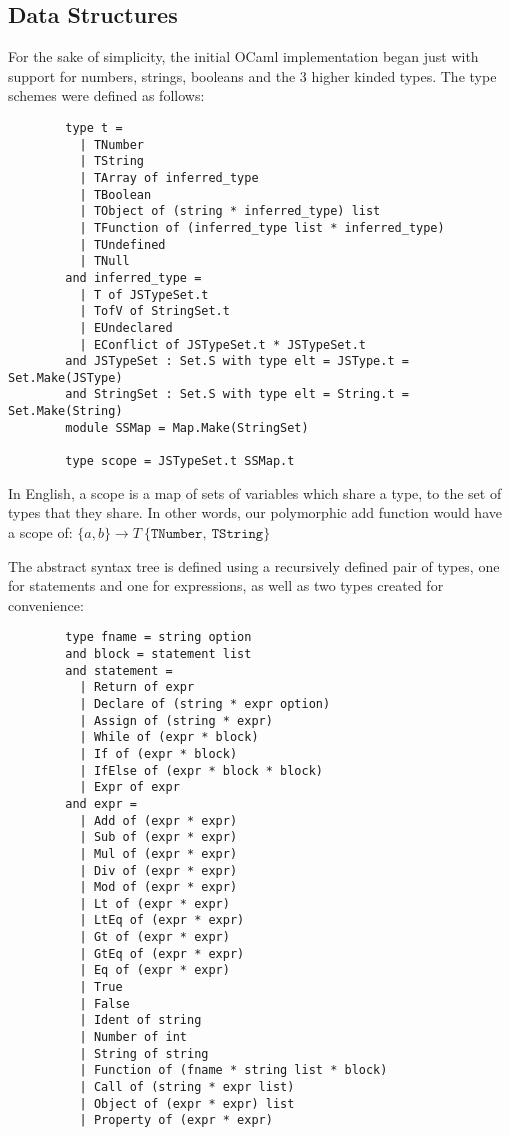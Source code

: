 \documentclass[british, twoside, openright]{bhamthesis}
\theoremstyle{definition}
\begin{document}
    \subsection{Data Structures}
      For the sake of simplicity, the initial OCaml implementation began just with support for numbers, strings, booleans and the 3 higher kinded types. The type schemes were defined as follows:

      \begin{lstlisting}
        type t =
          | TNumber
          | TString
          | TArray of inferred_type
          | TBoolean
          | TObject of (string * inferred_type) list
          | TFunction of (inferred_type list * inferred_type)
          | TUndefined
          | TNull
        and inferred_type =
          | T of JSTypeSet.t
          | TofV of StringSet.t
          | EUndeclared
          | EConflict of JSTypeSet.t * JSTypeSet.t
        and JSTypeSet : Set.S with type elt = JSType.t = Set.Make(JSType)
        and StringSet : Set.S with type elt = String.t = Set.Make(String)
        module SSMap = Map.Make(StringSet)

        type scope = JSTypeSet.t SSMap.t
      \end{lstlisting}

      In English, a scope is a map of sets of variables which share a type, to the set of types that they share. In other words, our polymorphic add function would have a scope of:
      \begin{math}
        \{a, b\} \rightarrow T~\{\texttt{TNumber},~\texttt{TString}\}
      \end{math}

      The abstract syntax tree is defined using a recursively defined pair of types, one for statements and one for expressions, as well as two types created for convenience:

      \begin{lstlisting}
        type fname = string option
        and block = statement list
        and statement =
          | Return of expr
          | Declare of (string * expr option)
          | Assign of (string * expr)
          | While of (expr * block)
          | If of (expr * block)
          | IfElse of (expr * block * block)
          | Expr of expr
        and expr =
          | Add of (expr * expr)
          | Sub of (expr * expr)
          | Mul of (expr * expr)
          | Div of (expr * expr)
          | Mod of (expr * expr)
          | Lt of (expr * expr)
          | LtEq of (expr * expr)
          | Gt of (expr * expr)
          | GtEq of (expr * expr)
          | Eq of (expr * expr)
          | True
          | False
          | Ident of string
          | Number of int
          | String of string
          | Function of (fname * string list * block)
          | Call of (string * expr list)
          | Object of (expr * expr) list
          | Property of (expr * expr)
      \end{lstlisting}
\end{document}
